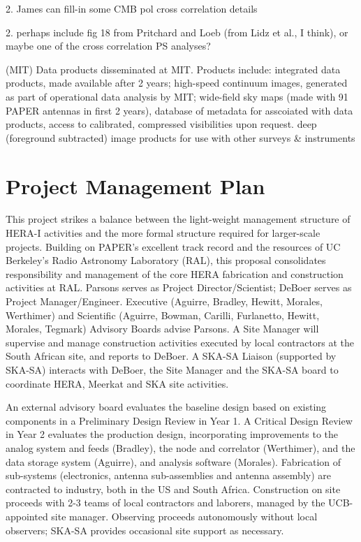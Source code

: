 \documentclass[preprint]{aastex}
\begin{document}
2. James can fill-in some CMB pol cross correlation details

2. perhaps include fig 18 from Pritchard and Loeb (from Lidz et al., I think), or maybe one of the cross correlation PS analyses?

(MIT) Data products disseminated at MIT.  Products include:
integrated data products, made available after 2 years;
high-speed continuum images, generated as part of operational data analysis by MIT;
wide-field sky maps (made with 91 PAPER antennas in first 2 years),
database of metadata  for asscoiated with data products,
access to calibrated, compressed visibilities upon request.
deep (foreground subtracted) image products for use with other surveys \& instruments

\section{Project Management Plan}

This project strikes a balance between the light-weight
management structure of HERA-I activities and the more formal structure
required for larger-scale projects.  Building on PAPER's excellent track record
and the resources of UC Berkeley's Radio Astronomy Laboratory (RAL),
this proposal consolidates responsibility and management of the core HERA
fabrication and construction activities at RAL. Parsons serves as
Project Director/Scientist; DeBoer serves as Project Manager/Engineer.
Executive
(Aguirre, Bradley, Hewitt, Morales, Werthimer)
and Scientific (Aguirre, Bowman, Carilli, Furlanetto, Hewitt, Morales, Tegmark) Advisory Boards advise Parsons.
A Site Manager will supervise and manage
construction activities executed by local contractors at the South African
site, and reports to DeBoer.  A SKA-SA Liaison (supported by SKA-SA)
interacts with DeBoer, the Site Manager and the SKA-SA board to
coordinate HERA, Meerkat and SKA site activities.

An external advisory board evaluates the baseline design
based on existing components in a Preliminary Design Review in Year 1.
A Critical Design Review in Year 2 evaluates the
production design, incorporating improvements to the analog system
and feeds (Bradley), the node and correlator (Werthimer), and the data storage
system (Aguirre), and analysis software (Morales).
Fabrication of sub-systems (electronics, antenna sub-assemblies and antenna assembly)
are contracted to industry, both in the US and South Africa.   Construction on site proceeds
with 2-3 teams of local contractors and laborers, managed by the UCB-appointed site manager.  Observing proceeds autonomously without local observers; SKA-SA
provides occasional site support as necessary.
\end{document}
